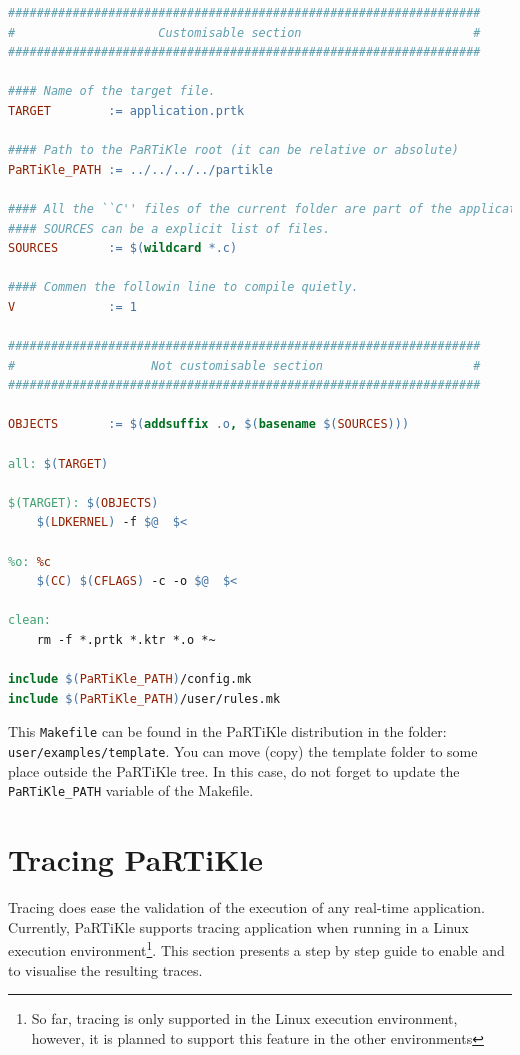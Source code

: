 \documentclass[a4paper,10pt,twoside]{report}
\begin{document}
\begin{lstlisting}[language=make,basicstyle=\small,framexrightmargin
    =-14mm,xleftmargin=14mm]
##################################################################
#                    Customisable section                        #
##################################################################

#### Name of the target file.
TARGET        := application.prtk

#### Path to the PaRTiKle root (it can be relative or absolute)
PaRTiKle_PATH := ../../../../partikle

#### All the ``C'' files of the current folder are part of the application.
#### SOURCES can be a explicit list of files.
SOURCES       := $(wildcard *.c)

#### Commen the followin line to compile quietly.
V             := 1

##################################################################
#                   Not customisable section                     #
##################################################################

OBJECTS       := $(addsuffix .o, $(basename $(SOURCES)))

all: $(TARGET)

$(TARGET): $(OBJECTS)
	$(LDKERNEL) -f $@  $<

%o: %c
	$(CC) $(CFLAGS) -c -o $@  $<

clean:
	rm -f *.prtk *.ktr *.o *~

include $(PaRTiKle_PATH)/config.mk
include $(PaRTiKle_PATH)/user/rules.mk
\end{lstlisting}

This \texttt{Makefile} can be found in the PaRTiKle distribution in
the folder: \texttt{user/examples/template}. You can move (copy) the
template folder to some place outside the PaRTiKle tree. In this case,
do not forget to update the \texttt{PaRTiKle\_PATH} variable of the
Makefile.

\section{Tracing PaRTiKle}

Tracing does ease the validation of the execution of any real-time
application. Currently, PaRTiKle supports tracing application when
running in a Linux execution environment\footnote{So far, tracing is
only supported in the Linux execution environment, however, it is
planned to support this feature in the other environments}. This
section presents a step by step guide to enable and to visualise the
resulting traces.
 
\end{document}
